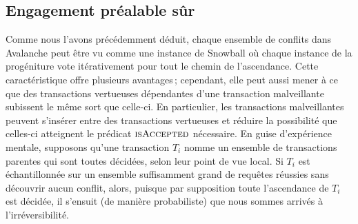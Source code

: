 \documentclass[a4,twocolumn,10pt]{article}
\theoremstyle{definition}
\begin{document}
\begin{appendices}
\subsection{Engagement préalable sûr}
Comme nous l'avons précédemment déduit, chaque ensemble de conflits dans Avalanche peut être vu comme une instance de Snowball où chaque instance de la progéniture vote itérativement pour tout le chemin de l'ascendance. 
Cette caractéristique offre plusieurs avantages\,; cependant, elle peut aussi mener à ce que des transactions vertueuses dépendantes d'une tran\-saction malveillante subissent le même sort que celle-ci.
En particulier, les transactions malveillantes peuvent s'insérer entre des transactions vertueuses et réduire la possibilité que celles-ci atteignent le prédicat $\textsc{isAccepted}$ nécessaire.
En guise d'expérience mentale, supposons qu'une transaction $T_i$ nomme un ensemble de transactions parentes qui sont toutes décidées, selon leur point de vue local.
Si $T_i$ est échantillonnée sur un ensemble suffisamment grand de requêtes réussies sans découvrir aucun conflit, alors, puisque par supposition toute l'ascendance de $T_i$ est décidée, il s'ensuit (de manière probabiliste) que nous sommes arrivés à l'irréversibilité.


\end{appendices}
\end{document}
